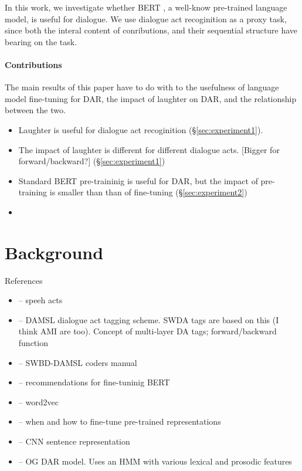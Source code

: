 \documentclass[11pt,a4paper]{article}
\begin{document}
In this work, we investigate whether BERT \citep{devlinBERTPretrainingDeep2018}, a well-know pre-trained language model, is useful for dialogue.
We use dialogue act recoginition as a proxy task, since both the interal content of conributions, and their sequential structure have bearing on the task.

\paragraph{Contributions}
The main results of this paper have to do with to the usefulness of language model fine-tuning for DAR, 
the impact of laughter on DAR, and the relationship between the two.
\begin{itemize}
  \item Laughter is useful for dialogue act recoginition (\S\ref{sec:experiment1}).
  \item The impact of laughter is different for different dialogue acts. [Bigger for forward/backward?] (\S\ref{sec:experiment1})
  \item Standard BERT pre-traininig is useful for DAR, but the impact of pre-training is smaller than than of fine-tuning (\S\ref{sec:experiment2})
  \item 
\end{itemize}


\section{Background} %

References
\begin{itemize}
  \item \citet{austinHowThingsWords2009} -- speeh acts
  \item \citet{coreCodingDialogsDAMSL1997} -- DAMSL dialogue act tagging scheme. SWDA tags are based on this (I think AMI are too). Concept of multi-layer DA tags; forward/backward function
  \item \citet{jurafskySwitchboardSWBDDAMSLShallowDiscourseFunction1997a} -- SWBD-DAMSL coders manual
  \item \citet{sunHowFineTuneBERT2019} -- recommendations for fine-tuninig BERT
  \item \citet{mikolovDistributedRepresentationsWords2013} -- word2vec
  \item \citet{petersTuneNotTune2019} -- when and how to fine-tune pre-trained representations
  \item \citet{kimConvolutionalNeuralNetworks2014} -- CNN sentence representation
  \item \citet{stolckeDialogueActModeling2000} -- OG DAR model. Uses an HMM with various lexical and prosodic features
\end{itemize}
\end{document}
